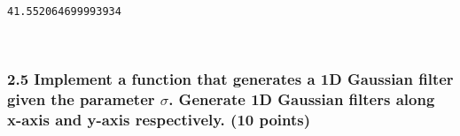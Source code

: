 \documentclass[11pt]{article}
\begin{document}
    \begin{Verbatim}[commandchars=\\\{\}]
41.552064699993934

    \end{Verbatim}

    \begin{center}
    \end{center}
    { \hspace*{\fill} \\}
    
    \subsubsection{\texorpdfstring{2.5 Implement a function that generates a
1D Gaussian filter given the parameter \(\sigma\). Generate 1D Gaussian
filters along x-axis and y-axis respectively. (10
points)}{2.5 Implement a function that generates a 1D Gaussian filter given the parameter \textbackslash{}sigma. Generate 1D Gaussian filters along x-axis and y-axis respectively. (10 points)}}\label{implement-a-function-that-generates-a-1d-gaussian-filter-given-the-parameter-sigma.-generate-1d-gaussian-filters-along-x-axis-and-y-axis-respectively.-10-points}
\end{document}
